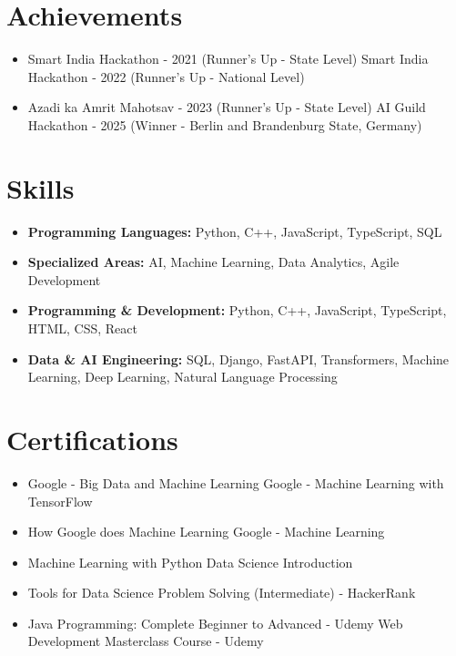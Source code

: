 \documentclass[a4paper,10pt]{article}
\begin{document}
\section*{Achievements}
\begin{itemize}
\item Smart India Hackathon - 2021 (Runner's Up - State Level) \hfill Smart India Hackathon - 2022 (Runner's Up - National Level)
\item Azadi ka Amrit Mahotsav - 2023 (Runner's Up - State Level) \hfill AI Guild Hackathon - 2025 (Winner - Berlin and Brandenburg State, Germany)
\end{itemize}

\section*{Skills}
\begin{itemize}
  \item \textbf{Programming Languages:} Python, C++, JavaScript, TypeScript, SQL
  \item \textbf{Specialized Areas:} AI, Machine Learning, Data Analytics, Agile Development
  \item \textbf{Programming \& Development:} Python, C++, JavaScript, TypeScript, HTML, CSS, React
  \item \textbf{Data \& AI Engineering:} SQL, Django, FastAPI, Transformers, Machine Learning, Deep Learning, Natural Language Processing
\end{itemize}

\section*{Certifications}
\begin{itemize}
\item Google - Big Data and Machine Learning \hfill Google - Machine Learning with TensorFlow
\item How Google does Machine Learning \hfill Google - Machine Learning
\item Machine Learning with Python \hfill Data Science Introduction
\item Tools for Data Science \hfill Problem Solving (Intermediate) - HackerRank
\item Java Programming: Complete Beginner to Advanced - Udemy \hfill Web Development Masterclass Course - Udemy
\end{itemize}
\end{document}
